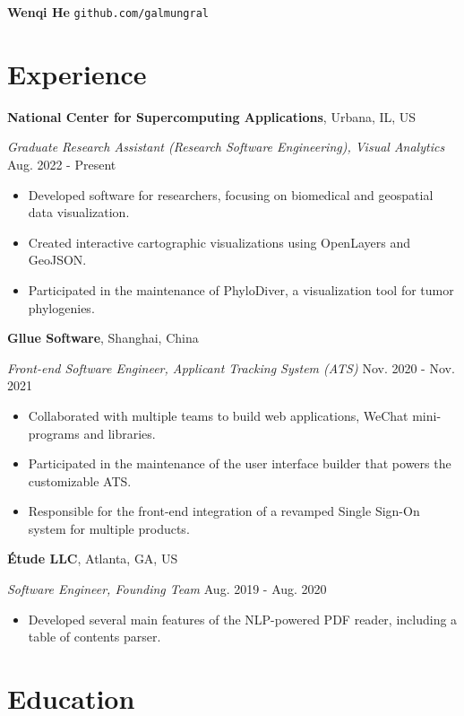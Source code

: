 \documentclass[11pt]{article}
\begin{document}
{\Huge\bf Wenqi He} \quad \texttt{github.com/galmungral}

\section*{Experience}

\textbf{National Center for Supercomputing Applications}, Urbana, IL, US

\textit{Graduate Research Assistant (Research Software Engineering), Visual Analytics} \hfill Aug. 2022 - Present

\begin{itemize}
\item Developed software for researchers, focusing on biomedical and geospatial data visualization.
\item Created interactive cartographic visualizations using OpenLayers and GeoJSON.
\item Participated in the maintenance of PhyloDiver, a visualization tool for tumor phylogenies.
\end{itemize}

\textbf{Gllue Software}, Shanghai, China

\textit{Front-end Software Engineer, Applicant Tracking System (ATS)} \hfill Nov. 2020 - Nov. 2021

\begin{itemize}
\item Collaborated with multiple teams to build web applications, WeChat mini-programs and libraries.
\item Participated in the maintenance of the user interface builder that powers the customizable ATS.
\item Responsible for the front-end integration of a revamped Single Sign-On system for multiple products.
\end{itemize}

\textbf{Étude LLC}, Atlanta, GA, US

\textit{Software Engineer, Founding Team} \hfill Aug. 2019 - Aug. 2020

\begin{itemize}
\item Developed several main features of the NLP-powered PDF reader, including a table of contents parser.
\end{itemize}

\section*{Education}
\end{document}
